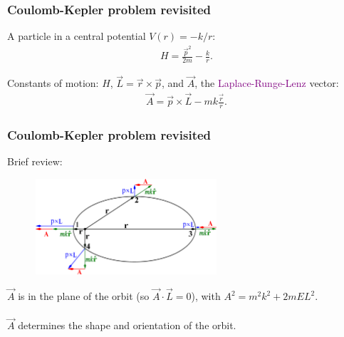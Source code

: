 \documentclass{beamer}
\theoremstyle{definition}
\newcommand{\f}[2]{\frac{#1}{#2}}
\begin{document}
\begin{frame}
	\frametitle{Coulomb-Kepler problem revisited}
	A particle in a central potential $V(r) = -k/r$:
	\begin{align*}
	H = \f{\vec{p}^2}{2m} - \f{k}{r}.
	\end{align*}
	
	\pause
	
	Constants of motion: $H$, \pause
	$\vec{L} = \vec{r}\times \vec{p}$,  \pause
	and $\vec{A}$, \pause
	the \textcolor{purple}{Laplace-Runge-Lenz} vector:
	\begin{align*}
	\vec{A} = \vec{p}\times \vec{L} - m k \f{ \vec{r}}{r}.
	\end{align*}	
	
	
	\end{frame}



\begin{frame}
\frametitle{Coulomb-Kepler problem revisited}

Brief review: 
\begin{figure}
\centering
\includegraphics[width=0.6\textwidth]{figures/LRL.eps}
\end{figure}

\pause

$\vec{A}$ is in the plane of the orbit (so $\vec{A}\cdot \vec{L} = 0$), with ${A}^2 = m^2 k^2 + 2m E {L}^2$. \\
\,\,\, \\  \pause
$\vec{A}$ determines the shape and orientation of the orbit.


\end{frame}
\end{document}
